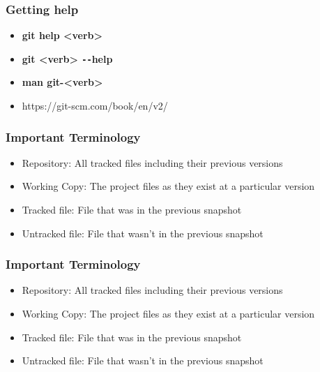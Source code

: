 \documentclass{beamer}
\begin{document}
\begin{frame}
	\frametitle{Getting help}
	\begin{itemize}
		\item{\textbf{git help \textless{}verb\textgreater{}}}
		\item{\textbf{git \textless{}verb\textgreater{} \texttt{-{}-}help}}
		\item{\textbf{man git-\textless{}verb\textgreater{}}}
		\item{https://git-scm.com/book/en/v2/}
	\end{itemize}
\end{frame}

\begin{frame}
	\frametitle{Important Terminology}
	\begin{itemize}
		\item{Repository: All tracked files including their previous versions}
		\item{Working Copy: The project files as they exist at a particular version}
		\item{Tracked file: File that was in the previous snapshot}
		\item{Untracked file: File that wasn't in the previous snapshot}
	\end{itemize}
\end{frame}

\begin{frame}
	\frametitle{Important Terminology}
	\begin{itemize}
		\item{Repository: All tracked files including their previous versions}
		\item{Working Copy: The project files as they exist at a particular version}
		\item{Tracked file: File that was in the previous snapshot}
		\item{Untracked file: File that wasn't in the previous snapshot}
	\end{itemize}
\end{frame}

\end{document}

